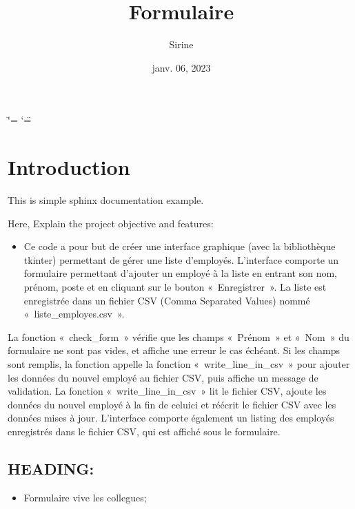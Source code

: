 \documentclass[letterpaper,10pt,french]{sphinxmanual}
\title{Formulaire}
\date{janv. 06, 2023}
\author{Sirine}
\begin{document}
\ifdefined\shorthandoff
  \ifnum\catcode`\=\string=\active\shorthandoff{=}\fi
  \ifnum\catcode`\"=\active{}\fi
\fi

\pagestyle{empty}
\sphinxmaketitle
\pagestyle{plain}
\sphinxtableofcontents
\pagestyle{normal}
\label{\detokenize{index::doc}}



\chapter{Introduction}
\label{\detokenize{introduction:introduction}}\label{\detokenize{introduction::doc}}
\sphinxAtStartPar
This is simple sphinx documentation example.

\sphinxAtStartPar
Here, Explain the project objective and features:
\begin{itemize}
\item {} 
\sphinxAtStartPar
Ce code a pour but de créer une interface graphique (avec la bibliothèque tkinter) permettant de gérer une liste d’employés. L’interface comporte un formulaire permettant d’ajouter un employé à la liste en entrant son nom, prénom, poste et en cliquant sur le bouton « Enregistrer ». La liste est enregistrée dans un fichier CSV (Comma Separated Values) nommé « liste\_employes.csv ».

\end{itemize}

\sphinxAtStartPar
La fonction « check\_form » vérifie que les champs « Prénom » et « Nom » du formulaire ne sont pas vides, et affiche une erreur le cas échéant. Si les champs sont remplis, la fonction appelle la fonction « write\_line\_in\_csv » pour ajouter les données du nouvel employé au fichier CSV, puis affiche un message de validation.
La fonction « write\_line\_in\_csv » lit le fichier CSV, ajoute les données du nouvel employé à la fin de celui\sphinxhyphen{}ci et réécrit le fichier CSV avec les données mises à jour.
L’interface comporte également un listing des employés enregistrés dans le fichier CSV, qui est affiché sous le formulaire.


\section{HEADING:}
\label{\detokenize{introduction:heading}}\begin{itemize}
\item {} 
\sphinxAtStartPar
Formulaire vive les collegues;

\end{itemize}
\end{document}
